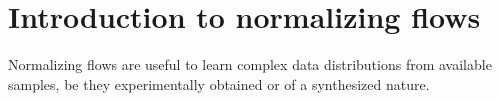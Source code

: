 \documentclass[a4paper,12pt]{report}
\begin{document}
%
\FloatBarrier

\section{Introduction to normalizing flows}
Normalizing flows are useful to learn complex data distributions from available samples, be they experimentally obtained or of a synthesized nature. 
\end{document}
